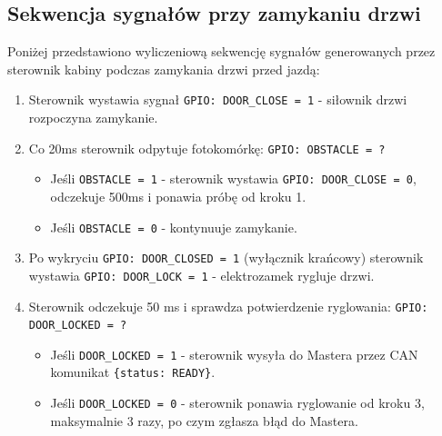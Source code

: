 \documentclass[a4paper,12pt]{article}
\begin{document}
\subsection{Sekwencja sygnałów przy zamykaniu drzwi}
Poniżej przedstawiono wyliczeniową sekwencję sygnałów generowanych przez sterownik kabiny podczas zamykania drzwi przed jazdą:
\begin{enumerate}
    \item Sterownik wystawia sygnał \texttt{GPIO: DOOR\_CLOSE = 1} - siłownik drzwi rozpoczyna zamykanie.
    \item Co 20ms sterownik odpytuje fotokomórkę: \texttt{GPIO: OBSTACLE = ?}
    \begin{itemize}
        \item Jeśli \texttt{OBSTACLE = 1} - sterownik wystawia \texttt{GPIO: DOOR\_CLOSE = 0}, odczekuje 500ms i ponawia próbę od kroku 1.
        \item Jeśli \texttt{OBSTACLE = 0} - kontynuuje zamykanie.
    \end{itemize}
    \item Po wykryciu \texttt{GPIO: DOOR\_CLOSED = 1} (wyłącznik krańcowy) sterownik wystawia \texttt{GPIO: DOOR\_LOCK = 1} - elektrozamek rygluje drzwi.
    \item Sterownik odczekuje 50 ms i sprawdza potwierdzenie ryglowania: \break\texttt{GPIO: DOOR\_LOCKED = ?}
    \begin{itemize}
        \item Jeśli \texttt{DOOR\_LOCKED = 1} - sterownik wysyła do Mastera przez CAN komunikat \break\texttt{\{status: READY\}}.
        \item Jeśli \texttt{DOOR\_LOCKED = 0} - sterownik ponawia ryglowanie od kroku 3, maksymalnie 3 razy, po czym zgłasza błąd do Mastera.
    \end{itemize}
\end{enumerate}
\end{document}
